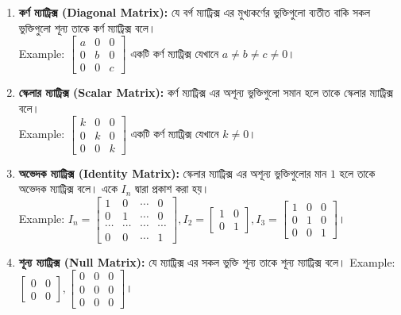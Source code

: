 \begin{enumerate}
\begin{tcolorbox}
	\end{tcolorbox}
	\item \textbf{কর্ণ ম্যাট্রিক্স (Diagonal Matrix):} যে বর্গ ম্যাট্রিক্স এর মুখ্যকর্ণের ভুক্তিগুলো ব্যতীত বাকি সকল ভুক্তিগুলো শূন্য তাকে কর্ণ ম্যাট্রিক্স বলে। \\
	Example:
	$$ একটি কর্ণ ম্যাট্রিক্স যেখানে $a\neq b\neq c$। 
	 
	\item \textbf{স্কেলার ম্যাট্রিক্স (Scalar Matrix):} কর্ণ ম্যাট্রিক্স এর অশূন্য ভুক্তিগুলো সমান হলে তাকে স্কেলার ম্যাট্রিক্স বলে। \\
	Example: 
	$$ একটি কর্ণ ম্যাট্রিক্স যেখানে $k$।
	\item \textbf{অভেদক ম্যাট্রিক্স (Identity Matrix):} স্কেলার ম্যাট্রিক্স এর অশূন্য ভুক্তিগুলোর মান $1$ হলে তাকে অভেদক ম্যাট্রিক্স বলে। একে $I_{n}$ দ্বারা প্রকাশ করা হয়।\\ Example: 
	$
	I_{n}=,
	I_{2}=\left[\begin{array}{cc}
	1 & 0 \\
	0 & 1
	\end{array}\right],
	I_{3}=
	$।
	
	\item \textbf{শূন্য ম্যাট্রিক্স (Null Matrix):} যে ম্যাট্রিক্স এর সকল ভুক্তি শূন্য তাকে শূন্য ম্যাট্রিক্স বলে। Example: 
	$\left[\begin{array}{cc}
	0 & 0 \\
	0 & 0
	\end{array}\right], 
	$।
	

\end{enumerate}
